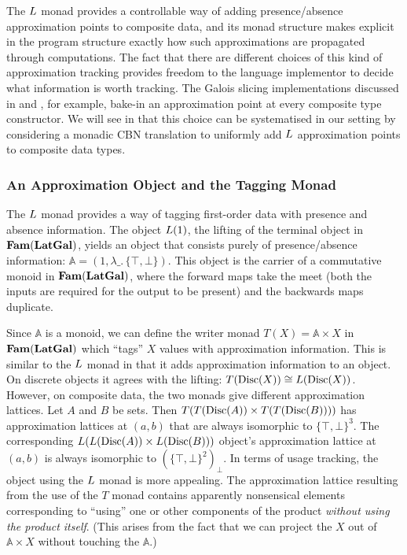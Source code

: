 The $L$ monad provides a controllable way of adding
presence/absence approximation points to composite data, and its monad
structure makes explicit in the program structure exactly how such
approximations are propagated through computations. The fact that
there are different choices of this kind of approximation tracking
provides freedom to the language implementor to decide what
information is worth tracking. The Galois slicing implementations
discussed in \citet{perera12a} and \citet{ricciotti17}, for example,
bake-in an approximation point at every composite type constructor. We
will see in  that this choice can be
systematised in our setting by considering a monadic CBN translation
to uniformly add $L$ approximation points to composite data types.

\subsubsection{An Approximation Object and the Tagging Monad}
\label{sec:tagging-monad}

The $L$ monad provides a way of tagging first-order data with
presence and absence information. The object $L(1)$, the lifting
of the terminal object in $\mathbf{Fam}(\mathbf{LatGal})$, yields an object that
consists purely of presence/absence information:
$\mathbb{A} = (1, \lambda\_.\,\{\top,\bot\})$. This object is the
carrier of a commutative monoid in $\mathbf{Fam}(\mathbf{LatGal})$, where the forward
maps take the meet (both the inputs are required for the output to be
present) and the backwards maps duplicate.%

Since $\mathbb{A}$ is a monoid, we can define the writer monad
$T(X) = \mathbb{A} \times X$ in $\mathbf{Fam}(\mathbf{LatGal})$ which ``tags'' $X$
values with approximation information. This is similar to the $L$
monad in that it adds approximation information to an object. On
discrete objects it agrees with the lifting:
$T(\mathrm{Disc}(X)) \cong L(\mathrm{Disc}(X))$. However, on composite data, the two
monads give different approximation lattices. Let $A$ and $B$ be sets.
Then $T(T(\mathrm{Disc}(A)) \times T(T(\mathrm{Disc}(B))))$ has approximation lattices
at $(a,b)$ that are always isomorphic to $\{\top,\bot\}^3$. The
corresponding $L(L(\mathrm{Disc}(A)) \times L(\mathrm{Disc}(B)))$ object's
approximation lattice at $(a,b)$ is always isomorphic to
$(\{\top,\bot\}^2)_\bot$.
In terms of usage tracking, the object using the $L$ monad is more
appealing. The approximation lattice resulting from the use of the $T$
monad contains apparently nonsensical elements corresponding to
``using'' one or other components of the product \emph{without using
  the product itself}. (This arises from the fact that we can project
the $X$ out of $\mathbb{A} \times X$ without touching the
$\mathbb{A}$.)


